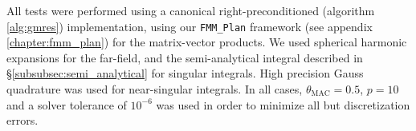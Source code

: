 All tests were performed using a canonical right-preconditioned {\gmres} (algorithm \ref{alg:gmres}) implementation, using our \lstinline|FMM_Plan| framework (see appendix \ref{chapter:fmm_plan}) for the matrix-vector products. We used spherical harmonic expansions for the far-field, and the semi-analytical integral described in \S\ref{subsubsec:semi_analytical} for singular integrals. High precision Gauss quadrature was used for near-singular integrals. In all cases, $\theta_{\text{MAC}} = 0.5$, $p = 10$ and a solver tolerance of $10^{-6}$ was used in order to minimize all but discretization errors.

%
%	

